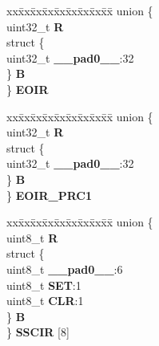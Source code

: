 \begin{DoxyCompactItemize}
\begin{tabbing}
\end{tabbing}\item 
\mbox{\label{structINTC__tag_a04c2debfcf06c2762ac54709b67394c9}} 
\begin{tabbing}
xx\=xx\=xx\=xx\=xx\=xx\=xx\=xx\=xx\=\kill
union \{\\
\>uint32\_t {\bfseries R}\\
\>struct \{\\
\>\>uint32\_t {\bfseries \_\_pad0\_\_}:32\\
\>\} {\bfseries B}\\
\} {\bfseries EOIR}\\

\end{tabbing}\item 
\mbox{\label{structINTC__tag_ae388ebb712ea90251237ffaf87ea88ee}} 
\begin{tabbing}
xx\=xx\=xx\=xx\=xx\=xx\=xx\=xx\=xx\=\kill
union \{\\
\>uint32\_t {\bfseries R}\\
\>struct \{\\
\>\>uint32\_t {\bfseries \_\_pad0\_\_}:32\\
\>\} {\bfseries B}\\
\} {\bfseries EOIR\_PRC1}\\

\end{tabbing}\item 
\mbox{\label{structINTC__tag_aeca42addd5824715b59651a7183fa006}} 
\begin{tabbing}
xx\=xx\=xx\=xx\=xx\=xx\=xx\=xx\=xx\=\kill
union \{\\
\>uint8\_t {\bfseries R}\\
\>struct \{\\
\>\>uint8\_t {\bfseries \_\_pad0\_\_}:6\\
\>\>uint8\_t {\bfseries SET}:1\\
\>\>uint8\_t {\bfseries CLR}:1\\
\>\} {\bfseries B}\\
\} {\bfseries SSCIR} \mbox{[}8\mbox{]}\\


\end{tabbing}
\end{DoxyCompactItemize}
